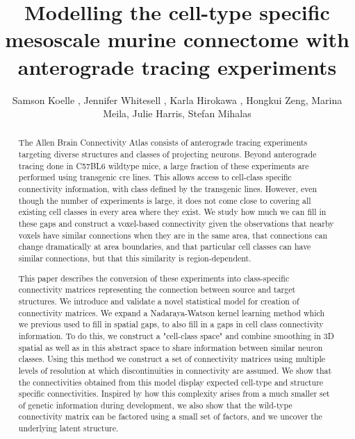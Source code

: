 \documentclass[NETN,manuscript]{stjour-new}
\begin{document}
\title{Modelling the cell-type specific mesoscale murine connectome with anterograde tracing experiments}

\author[Koelle et al]%
{Samson Koelle , Jennifer Whitesell , Karla Hirokawa ,  Hongkui Zeng, Marina Meila, Julie Harris, Stefan Mihalas}





\begin{abstract}
The Allen Brain Connectivity Atlas consists of anterograde tracing experiments targeting diverse
structures and classes of projecting neurons. Beyond anterograde tracing done in C57BL6 wildtype mice, a large fraction of these experiments are performed using transgenic cre lines. This allows access to cell-class specific connectivity information, with class defined by the transgenic lines.
However, even though the number of experiments is large, it does not come close to covering all existing cell classes in every area where they exist.
We study how much we can fill in these gaps and construct a voxel-based connectivity given the observations that nearby voxels have similar connections when they are in the same area, that connections can change dramatically at area boundaries, and that particular cell classes can have similar connections, but that this similarity is region-dependent.  

This paper describes the conversion of these experiments into class-specific connectivity matrices representing the connection between source and target structures. We introduce and validate a novel statistical model for creation of connectivity matrices. We expand a Nadaraya-Watson kernel learning method which we previous used to fill in spatial gaps, to also fill in a gaps in cell class connectivity information. To do this, we construct a "cell-class space" and combine smoothing in 3D spatial as well as in this abstract space to share information between similar neuron classes.
Using this method we construct a set of connectivity matrices using multiple levels of resolution at which discontinuities in connectivity are assumed. We show that the connectivities obtained from this model display expected cell-type and structure specific connectivities. 
Inspired by how this complexity arises from a much smaller set of genetic information during development, we also show that the wild-type connectivity matrix can be factored using a small set of factors, and we uncover the underlying latent structure.

\end{abstract}
\end{document}
